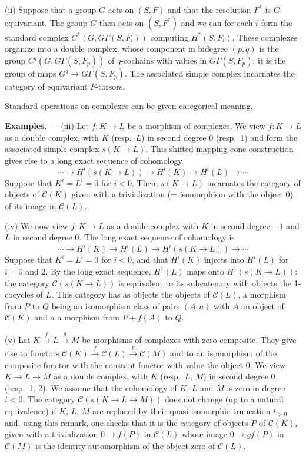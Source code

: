 \documentclass[11pt,a4paper]{article}
\theoremstyle{plain}
\theoremstyle{definition}
\newcommand{\cC}{\mathcal{C}}
\begin{document}
(ii) Suppose that a group $G$ acts on $(S, F)$ and that the resolution $F^*$ is $G$-equivariant. The group $G$ then acts on $(S, F^*)$ and we can for each $i$ form the standard complex $C^*(G, G\Gamma(S, F_i))$ computing $H^*(S, F_i)$. These complexes organize into a double complex, whose component in bidegree $(p,q)$ is the group $C^q(G, G\Gamma(S, F_p))$ of $q$-cochains with values in $G\Gamma(S, F_p)$; it is the group of maps $G^q \to G\Gamma(S, F_p)$. The associated simple complex incarnates the category of equivariant $F$-torsors.

Standard operations on complexes can be given categorical meaning.

\textbf{Examples.} --- (iii) Let $f: K \to L$ be a morphism of complexes. We view $f: K \to L$ as a double complex, with $K$ (resp.~$L$) in second degree 0 (resp.~1) and form the associated simple complex $s(K \to L)$. This shifted mapping cone construction gives rise to a long exact sequence of cohomology
\[\cdots \to H^i(s(K \to L)) \to H^i(K) \to H^i(L) \to \cdots\]
Suppose that $K^i = L^i = 0$ for $i < 0$. Then, $s(K \to L)$ incarnates the category of objects of $\cC(K)$ given with a trivialization (= isomorphism with the object 0) of its image in $\cC(L)$.

(iv) We now view $f: K \to L$ as a double complex with $K$ in second degree $-1$ and $L$ in second degree 0. The long exact sequence of cohomology is
\[\cdots \to H^i(K) \to H^i(L) \to H^i(s(K \to L)) \to \cdots\]
Suppose that $K^i = L^i = 0$ for $i < 0$, and that $H^i(K)$ injects into $H^i(L)$ for $i=0$ and 2. By the long exact sequence, $H^1(L)$ maps onto $H^1(s(K \to L))$: the category $\cC(s(K \to L))$ is equivalent to its subcategory with objects the 1-cocycles of $L$. This category has as objects the objects of $\cC(L)$, a morphism from $P$ to $Q$ being an isomorphism class of pairs $(A, a)$ with $A$ an object of $\cC(K)$ and $a$ a morphism from $P + f(A)$ to $Q$.

(v) Let $K \xrightarrow{f} L \xrightarrow{g} M$ be morphisms of complexes with zero composite. They give rise to functors $\cC(K) \xrightarrow{f} \cC(L) \xrightarrow{g} \cC(M)$ and to an isomorphism of the composite functor with the constant functor with value the object 0. We view $K \to L \to M$ as a double complex, with $K$ (resp.~$L$, $M$) in second degree 0 (resp.~1, 2). We assume that the cohomology of $K$, $L$ and $M$ is zero in degree $i < 0$. The category $\cC(s(K \to L \to M))$ does not change (up to a natural equivalence) if $K$, $L$, $M$ are replaced by their quasi-isomorphic truncation $t_{>0}$ and, using this remark, one checks that it is the category of objects $P$ of $\cC(K)$, given with a trivialization $0 \to f(P)$ in $\cC(L)$ whose image $0 \to gf(P)$ in $\cC(M)$ is the identity automorphism of the object zero of $\cC(L)$.
\end{document}

